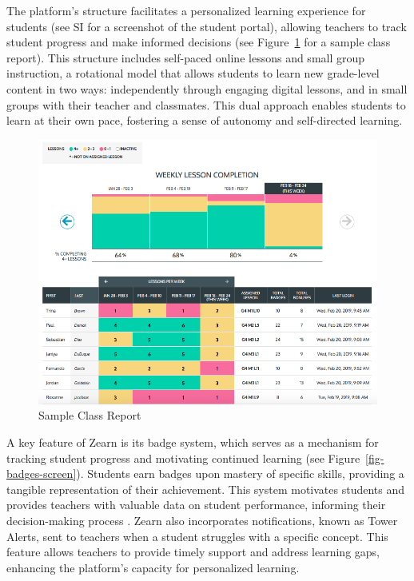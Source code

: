 \documentclass[
  number,
  preprint,
  3p,
  onecolumn]{elsarticle}
\begin{document}
The platform's structure facilitates a personalized learning experience
for students (see SI for a screenshot of the student portal), allowing
teachers to track student progress and make informed decisions (see
Figure~\ref{fig-class-report} for a sample class report). This structure
includes self-paced online lessons and small group instruction, a
rotational model that allows students to learn new grade-level content
in two ways: independently through engaging digital lessons, and in
small groups with their teacher and classmates. This dual approach
enables students to learn at their own pace, fostering a sense of
autonomy and self-directed learning.

\begin{figure}

{\centering \includegraphics{images/class-report.png}

}

\caption{\label{fig-class-report}Sample Class Report}

\end{figure}

A key feature of Zearn is its badge system, which serves as a mechanism
for tracking student progress and motivating continued learning (see
Figure~\ref{fig-badges-screen}). Students earn badges upon mastery of
specific skills, providing a tangible representation of their
achievement. This system motivates students and provides teachers with
valuable data on student performance, informing their decision-making
process \citep{knudsen2020}. Zearn also incorporates notifications,
known as Tower Alerts, sent to teachers when a student struggles with a
specific concept. This feature allows teachers to provide timely support
and address learning gaps, enhancing the platform's capacity for
personalized learning.
\end{document}
